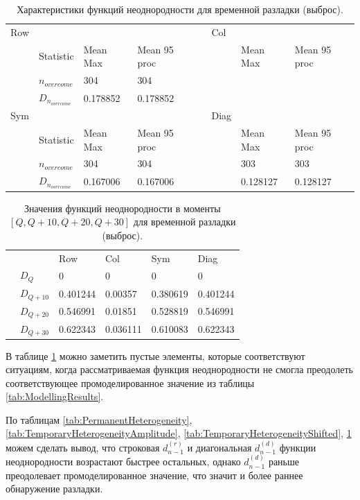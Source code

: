 \documentclass[specialist, substylefile = spbu.rtx,
			   subf, href, 12pt]{disser}
\begin{document}
\begin{table}[!hhh]
	\center
	\caption{Характеристики функций неоднородности для временной разладки (выброс).}
	\begin{tabular}{llllllll}
		Row & 				   & 		  	  & 			 && Col & 		      & 			      \\
		& Statistic        & Mean Max 	  & Mean 95 proc && 	& Mean Max     & Mean 95 proc     \\
		& $n_{overcome}$   & 304   	  & 304      &&     &        &  		  \\
		&$D_{n_{overcome}}$& 0.178852		  &	0.178852	 &&     & 		  &               \\
		Sym & 				   & 		  	  & 			 && Diag& 		      & 			      \\
		& Statistic        & Mean Max 	  & Mean 95 proc && 	& Mean Max     & Mean 95 proc     \\
		& $n_{overcome}$   & 304   	  & 304      &&     & 303      & 303		  \\
		&$D_{n_{overcome}}$& 0.167006		  &	0.167006		 &&     & 0.128127		 & 0.128127             \\
	\end{tabular}
	\label{tab:TemporaryHeterogeneityOutlier}
\end{table}


\begin{table}[!hhh]
	\center
	\caption{Значения функций неоднородности в моменты $ [Q, Q+10, Q+20, Q+30] $ для временной разладки (выброс). }
	\begin{tabular}{llllll}
		&              & Row 	  & Col 	& Sym    & Diag  \\
		& $D_Q$        & 0	  & 0 	& 0 & 0		\\
		& $D_{Q+10}$   & 0.401244   & 0.00357  & 0.380619 & 0.401244	\\
		& $D_{Q+20}$   & 0.546991   & 0.01851  & 0.528819 & 0.546991	\\
		& $D_{Q+30}$   & 0.622343	  &	0.036111 & 0.610083 & 0.622343	
	\end{tabular}
	\label{tab:TemporaryHeterogeneityOutlierValues}
\end{table}

В таблице \ref{tab:TemporaryHeterogeneityOutlier} можно заметить пустые элементы, которые соответствуют ситуациям, когда рассматриваемая функция неоднородности не смогла преодолеть соответствующее промоделированное значение из таблицы \ref{tab:ModellingResults}.

По таблицам \ref{tab:PermanentHeterogeneity}, \ref{tab:TemporaryHeterogeneityAmplitude}, \ref{tab:TemporaryHeterogeneityShifted}, \ref{tab:TemporaryHeterogeneityOutlier} можем сделать вывод, что строковая $d_{n-1}^{(r)}$ и диагональная $d_{n-1}^{(d)}$ функции неоднородности возрастают быстрее остальных, однако $d_{n-1}^{(d)}$ раньше преодолевает промоделированное значение, что значит и более раннее обнаружение разладки.
\end{document}
